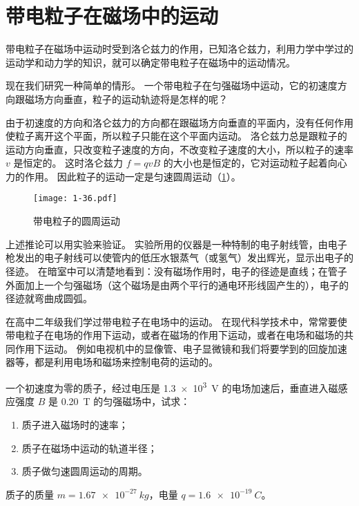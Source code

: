 \section{带电粒子在磁场中的运动}
带电粒子在磁场中运动时受到洛仑兹力的作用，已知洛仑兹力，利用力学中学过的运动学和动力学的知识，就可以确定带电粒子在磁场中的运动情况。

现在我们研究一种简单的情形。
一个带电粒子在匀强磁场中运动，它的初速度方向跟磁场方向垂直，粒子的运动轨迹将是怎样的呢？

由于初速度的方向和洛仑兹力的方向都在跟磁场方向垂直的平面内，没有任何作用使粒子离开这个平面，所以粒子只能在这个平面内运动。
洛仑兹力总是跟粒子的运动方向垂直，只改变粒子速度的方向，不改变粒子速度的大小，所以粒子的速率 $v$ 是恒定的。
这时洛仑兹力 $f=qvB$ 的大小也是恒定的，它对运动粒子起着向心力的作用。
因此粒子的运动一定是匀速圆周运动（\cref{fig:1-36}）。
\begin{figure}
	\texttt{[image: 1-36.pdf]}
  \caption{带电粒子的圆周运动}\label{fig:1-36}
\end{figure}

上述推论可以用实验来验证。
实验所用的仪器是一种特制的电子射线管，由电子枪发出的电子射线可以使管内的低压水银蒸气（或氢气）发出辉光，显示出电子的径迹。
在暗室中可以清楚地看到：没有磁场作用时，电子的径迹是直线；在管子外面加上一个匀强磁场（这个磁场是由两个平行的通电环形线固产生的），电子的径迹就弯曲成圆弧。

在高中二年级我们学过带电粒子在电场中的运动。
在现代科学技术中，常常要使带电粒子在电场的作用下运动，或者在磁场的作用下运动，或者在电场和磁场的共同作用下运动。
例如电视机中的显像管、电子显微镜和我们将要学到的回旋加速器等，都是利用电场和磁场来控制电荷的运动的。

\begin{example}
一个初速度为零的质子，经过电压是 \qty{1.3e3}{V} 的电场加速后，垂直进入磁感应强度 $B$ 是 \qty{0.20}{T} 的匀强磁场中，试求：
\begin{enumerate}
  \item 质子进入磁场时的速率；
  \item 质子在磁场中运动的轨道半径；
  \item 质子做匀速圆周运动的周期。
\end{enumerate}
质子的质量 $m=\qty{1.67e-27}{kg}$，电量 $q=\qty{1.6e-19}{C}$。
\end{example}

